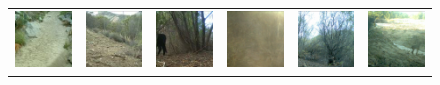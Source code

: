 \begin{figure}[htp!]
    \centering
    \begin{tabularx}{.7\textwidth}{Y Y Y !{\space} Y Y Y}
        \includegraphics{gfx/unconditional-diffusion-sampling-caltech-qual/rgb_5858c0dc-23d2-11e8-a6a3-ec086b02610b.jpg} & \includegraphics{gfx/unconditional-diffusion-sampling-caltech-qual/rgb_585a640e-23d2-11e8-a6a3-ec086b02610b.jpg} & \includegraphics{gfx/unconditional-diffusion-sampling-caltech-qual/rgb_585a6486-23d2-11e8-a6a3-ec086b02610b.jpg} & \includegraphics{gfx/unconditional-diffusion-sampling-caltech-qual/diffusion_00002.png} & \includegraphics{gfx/unconditional-diffusion-sampling-caltech-qual/diffusion_00001.png} & \includegraphics{gfx/unconditional-diffusion-sampling-caltech-qual/diffusion_00000.png} \\

\end{tabularx}
\end{figure}
